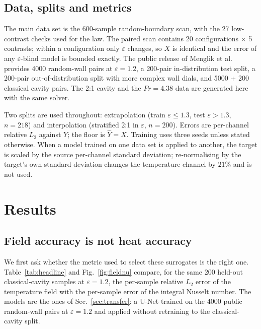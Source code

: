 \documentclass[preprint,11pt,a4paper,times]{elsarticle}
\begin{document}
\subsection{Data, splits and metrics}

The main data set is the 600-sample random-boundary scan, with the 27 low-contrast checks used
for the law. The paired scan contains 20 configurations $\times$ 5 contrasts; within a
configuration only $\varepsilon$ changes, so $X$ is identical and the error of any
$\varepsilon$-blind model is bounded exactly. The public release of Menglik et al.
\label{sec:public}
\citep{menglik2026neural}
provides 4000 random-wall pairs at $\varepsilon=1.2$, a 200-pair in-distribution test split,
a 200-pair out-of-distribution split with more complex wall dials, and 5000 + 200 classical
cavity pairs. The 2:1 cavity and the $Pr=4.38$ data are generated here with the same solver.

Two splits are used throughout: extrapolation (train $\varepsilon\le1.3$, test
$\varepsilon>1.3$, $n=218$) and interpolation (stratified 2:1 in $\varepsilon$, $n=200$).
Errors are per-channel relative $L_2$ against $Y$; the floor is $\hat Y=X$. Training uses
three seeds unless stated otherwise. When a model trained on one data set is applied to
another, the target is scaled by the source per-channel standard deviation; re-normalising by
the target's own standard deviation changes the temperature channel by $21\%$ and is not used.

\section{Results}
\label{sec:results}

\subsection{Field accuracy is not heat accuracy}
\label{sec:headline}

We first ask whether the metric used to select these surrogates is the right one.
Table~\ref{tab:headline} and Fig.~\ref{fig:fieldnu} compare, for the same 200 held-out
classical-cavity samples at $\varepsilon=1.2$, the per-sample relative $L_2$ error of the
temperature field with the per-sample error of the integral Nusselt number. The models are the
ones of Sec.~\ref{sec:transfer}: a U-Net trained on the 4000 public random-wall pairs at
$\varepsilon=1.2$ and applied without retraining to the classical-cavity split.
\end{document}
